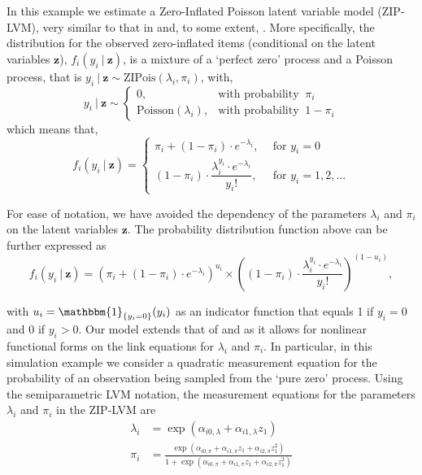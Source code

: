 \documentclass[11pt, a4paper]{article}
\newcommand{\cond}{\!~|~\!}
\begin{document}
In this example we estimate a Zero-Inflated Poisson latent variable model (ZIP-LVM), very similar to that in \citet{Wang_JoEdBS2010} and, to some extent, \citet{Hall_Biometrics2000}. More specifically, the distribution for the observed zero-inflated items (conditional on the latent variables $\mathbf{z}$), $f_i(y_i \cond \mathbf{z})$, is a mixture of a `perfect zero' process and a Poisson process, that is $y_i \cond \mathbf{z} \sim \text{ZIPois}(\lambda_i,\pi_i)$, with,
\begin{equation*}
y_i \cond \mathbf{z} \sim  
\begin{cases}
0, & \text{with probability } ~\pi_i \\
\text{Poisson}(\lambda_i), & \text{with probability } ~1-\pi_i
\end{cases}
\end{equation*}
which means that,
\begin{equation*}
f_i(y_{i} \cond \mathbf{z}) =
\begin{cases}
\pi_i + (1-\pi_i) \cdot e^{-\lambda_i}, & ~~\text{for } y_{i} = 0 \\[7pt]
(1-\pi_i) \cdot \dfrac{\lambda_i^{y_{i}} \cdot e^{-\lambda_i}}{y_{i}!}, & ~~\text{for } y_{i} = 1, 2, ...
\end{cases}
\end{equation*}

For ease of notation, we have avoided the dependency of the parameters $\lambda_i$ and $\pi_i$ on the latent variables $\mathbf{z}$. The probability distribution function above can be further expressed as 
\begin{equation*}
 f_i(y_{i} \cond \mathbf{z}) = \left(\pi_i + (1-\pi_i) \cdot e^{-\lambda_i}\right)^{u_{i}} \times \left((1-\pi_i) \cdot \dfrac{\lambda_i^{y_{i}} \cdot e^{-\lambda_i}}{y_{i}!}\right)^{(1-u_{i})},   
\end{equation*}

\noindent with $u_{i} = \mathbbm{1}_{\left\{y_i = 0\right\}}(y_{i})$ as an indicator function that equals 1 if $y_{i} = 0$ and 0 if $y_{i} > 0$. Our model extends that of \citet{Wang_JoEdBS2010} and \citet{Hall_Biometrics2000} as it allows for nonlinear functional forms on the link equations for $\lambda_i$ and $\pi_i$. In particular, in this simulation example we consider a quadratic measurement equation for the probability of an observation being sampled from the `pure zero' process. Using the semiparametric LVM notation, the measurement equations for the parameters $\lambda_i$ and $\pi_i$ in the ZIP-LVM are
\begin{align*}
\lambda_i & = \exp(\alpha_{i0,\lambda} + \alpha_{i1,\lambda} z_1) \\
\pi_i & = \frac{\exp(\alpha_{i0,\pi} + \alpha_{i1,\pi} z_1  + \alpha_{i2,\pi} z_1^2)}{1 + \exp(\alpha_{i0,\pi} + \alpha_{i1,\pi} z_1  + \alpha_{i2,\pi} z_1^2)}
\end{align*}
\end{document}
